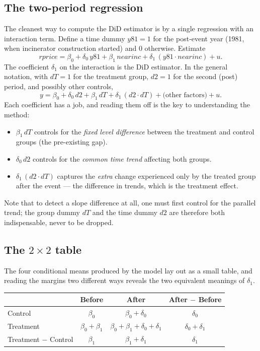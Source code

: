 \subsection{The two-period regression}

The cleanest way to compute the DiD estimator is by a single regression with an interaction term. Define a time dummy $y81=1$ for the post-event year (1981, when incinerator construction started) and $0$ otherwise. Estimate
\[
rprice = \beta_0 + \delta_0\, y81 + \beta_1\, nearinc + \delta_1\,(y81 \cdot nearinc) + u.
\]
The coefficient $\delta_1$ on the interaction is the DiD estimator. In the general notation, with $dT=1$ for the treatment group, $d2=1$ for the second (post) period, and possibly other controls,
\[
y = \beta_0 + \delta_0\, d2 + \beta_1\, dT + \delta_1\,(d2 \cdot dT) + \text{(other factors)} + u.
\]
Each coefficient has a job, and reading them off is the key to understanding the method:
\begin{itemize}
    \item $\beta_1\, dT$ controls for the \emph{fixed level difference} between the treatment and control groups (the pre-existing gap).
    \item $\delta_0\, d2$ controls for the \emph{common time trend} affecting both groups.
    \item $\delta_1\,(d2 \cdot dT)$ captures the \emph{extra} change experienced only by the treated group after the event --- the difference in trends, which is the treatment effect.
\end{itemize}
Note that to detect a slope difference at all, one must first control for the parallel trend; the group dummy $dT$ and the time dummy $d2$ are therefore both indispensable, never to be dropped.

\subsection{The \texorpdfstring{$2\times 2$}{2x2} table}

The four conditional means produced by the model lay out as a small table, and reading the margins two different ways reveals the two equivalent meanings of $\delta_1$.

\begin{center}
\renewcommand{\arraystretch}{1.5}
\begin{tabular}{@{}lccc@{}}
\toprule
 & Before & After & After $-$ Before \\
\midrule
Control   & $\beta_0$           & $\beta_0+\delta_0$                       & $\delta_0$ \\
Treatment & $\beta_0+\beta_1$   & $\beta_0+\beta_1+\delta_0+\delta_1$      & $\delta_0+\delta_1$ \\
\midrule
Treatment $-$ Control & $\beta_1$ & $\beta_1+\delta_1$ & $\delta_1$ \\
\bottomrule
\end{tabular}
\end{center}

